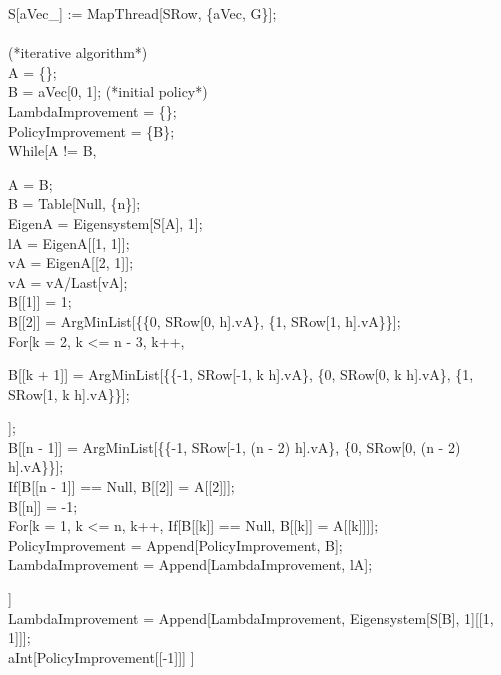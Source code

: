\begin{scriptsize}
\begin{addmargin}[1em]{0em}
  S[aVec\_] := MapThread[SRow, \{aVec, G\}];\\
  \\
  (*iterative algorithm*)\\
  A = \{\};\\
  B = aVec[0, 1]; (*initial policy*)\\
  LambdaImprovement = \{\};\\
  PolicyImprovement = \{B\};\\
  While[A != B,
     \begin{addmargin}[1em]{0em}
     A = B;\\
     B = Table[Null, \{n\}];\\
     EigenA = Eigensystem[S[A], 1];\\
     lA = EigenA[[1, 1]];\\
     vA = EigenA[[2, 1]];\\
     vA = vA/Last[vA];\\
     B[[1]] = 1;\\
     B[[2]] = ArgMinList[\{\{0, SRow[0, h].vA\}, \{1, SRow[1, h].vA\}\}];\\
     For[k = 2, k <= n - 3, k++,
      \begin{addmargin}[1em]{0em}
      B[[k + 1]] = ArgMinList[\{\{-1, SRow[-1, k h].vA\}, \{0, SRow[0, k h].vA\}, \{1, SRow[1, k h].vA\}\}];
      \end{addmargin}
      ];\\
     B[[n - 1]] = ArgMinList[\{\{-1, SRow[-1, (n - 2) h].vA\}, \{0, SRow[0, (n - 2) h].vA\}\}];\\
     If[B[[n - 1]] == Null, B[[2]] = A[[2]]];\\
     B[[n]] = -1;\\
     For[k = 1, k <= n, k++, If[B[[k]] == Null, B[[k]] = A[[k]]]];\\
     PolicyImprovement = Append[PolicyImprovement, B];\\
     LambdaImprovement = Append[LambdaImprovement, lA];
     \end{addmargin}
  ]\\   
  LambdaImprovement = Append[LambdaImprovement, Eigensystem[S[B], 1][[1, 1]]];\\
  aInt[PolicyImprovement[[-1]]]
  ]  
  \end{addmargin} 
   
\end{scriptsize}
\vspace{0.7cm}

